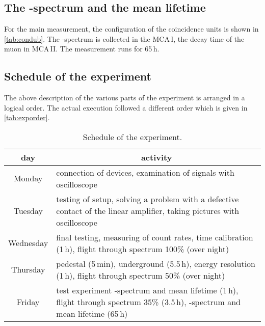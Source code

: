 \subsection{The \textbeta-spectrum and the mean lifetime}

For the main measurement, the configuration of the coincidence units is shown in \autoref{tab:condub}.
The \textbeta-spectrum is collected in the MCA\,I, the decay time of the muon in MCA\,II.
The measurement runs for 65\,h.


\subsection{Schedule of the experiment}
The above description of the various parts of the experiment is arranged in a logical order.
The actual execution followed a different order which is given in \autoref{tab:exporder}.

\begin{table}[H]
\caption{Schedule of the experiment.}
\begin{center}
\begin{tabular}{|c|p{12cm}|}
  \hline
  day				&  \multicolumn{1}{|c|}{activity} 		\\ \hline\hline
  Monday			& connection of devices, examination of signals with oscilloscope			\\ \hline
  Tuesday			& testing of setup, solving a problem with a defective contact of the linear amplifier, taking pictures with oscilloscope						\\ \hline
  Wednesday			& final testing, measuring of count rates, time calibration (1\,h), flight through spectrum 100\% (over night)				\\ \hline
  Thursday			& pedestal (5\,min), underground (5.5\,h), energy resolution (1\,h), flight through spectrum 50\% (over night)		\\ \hline
  Friday			& test experiment \textbeta-spectrum and mean lifetime (1\,h), flight through spectrum 35\% (3.5\,h), \textbeta-spectrum and mean lifetime (65\,h)			\\ \hline
 \end{tabular}
\end{center}
\label{tab:exporder}
\end{table}



